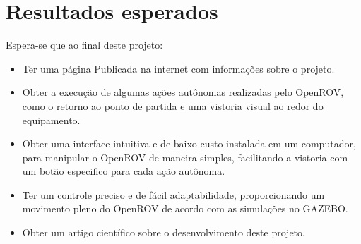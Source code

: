 \chapter{Resultados esperados}
Espera-se que ao final deste projeto:


\begin{itemize}

	\item Ter uma página Publicada na internet com informações sobre o projeto.
	\item Obter a execução de algumas ações autônomas realizadas pelo OpenROV, como o retorno ao ponto de partida e uma vistoria visual ao redor do equipamento.
	\item Obter uma interface intuitiva e de baixo custo instalada em um computador, para manipular o OpenROV de maneira simples, facilitando a vistoria com um botão especifico para cada ação autônoma.
	\item Ter um controle preciso e de fácil adaptabilidade, proporcionando um movimento pleno do OpenROV de acordo com as simulações no GAZEBO.
	\item Obter um artigo científico sobre o desenvolvimento deste projeto.

\end{itemize}
   

